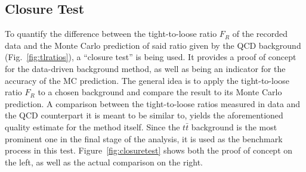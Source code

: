 \subsection{Closure Test}
\label{sec:closure-test}

To quantify the difference between the tight-to-loose ratio $F_R$ of the recorded data and the Monte Carlo prediction of said ratio given by the QCD background (Fig.~\ref{fig:tlratios}), a ``closure test'' is being used. It provides a proof of concept for the data-driven background method, as well as being an indicator for the accuracy of the MC prediction. The general idea is to apply the tight-to-loose ratio $F_R$ to a chosen background and compare the result to its Monte Carlo prediction. A comparison between the tight-to-loose ratios measured in data and the QCD counterpart it is meant to be similar to, yields the aforementioned quality estimate for the method itself. Since the $t\bar{t}$ background is the most prominent one in the final stage of the analysis, it is used as the benchmark process in this test. Figure~\ref{fig:closuretest} shows both the proof of concept on the left, as well as the actual comparison on the right.

